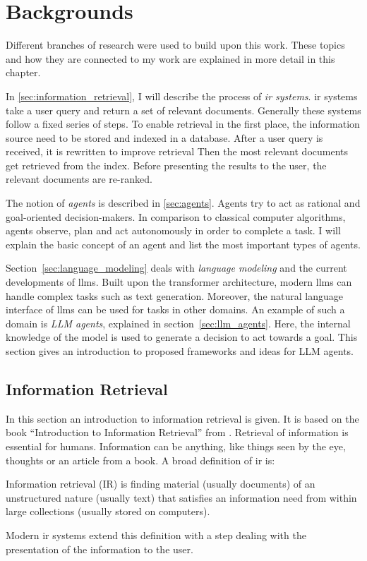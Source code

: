\documentclass[../main.tex]{subfiles}
\begin{document}
\chapter{Backgrounds}
\label{ch:backgrounds}

Different branches of research were used to build upon this work.
These topics and how they are connected to my work
are explained in more detail in this chapter.

In \autoref{sec:information_retrieval},
I will describe the process of \emph{\gls{ir} systems}.
\Gls{ir} systems take a user query and return a set of relevant documents.
Generally these systems follow a fixed series of steps.
To enable retrieval in the first place, the information source need to be stored and
indexed in a database.
After a user query is received, it is rewritten to improve retrieval
Then the most relevant documents get retrieved from the index.
Before presenting the results to the user, the relevant documents are re-ranked.

The notion of \emph{agents} is described in \autoref{sec:agents}.
Agents try to act as rational and goal-oriented decision-makers.
In comparison to classical computer algorithms,
agents observe, plan and act autonomously in order to complete a task.
I will explain the basic concept of an agent and list the most important types of agents.

Section~\ref{sec:language_modeling} deals with \emph{language modeling}
and the current developments of \glspl{llm}.
Built upon the transformer architecture,
modern \glspl{llm} can handle complex tasks such as text generation.
Moreover, the natural language interface of \glspl{llm} can be used for tasks in other domains.
An example of such a domain is \emph{LLM agents}, explained in section~\ref{sec:llm_agents}.
Here,
the internal knowledge of the model is used to generate a decision to act towards a goal.
This section gives an introduction to proposed frameworks and ideas for LLM agents.

\section{Information Retrieval}
\label{sec:information_retrieval}
In this section an introduction to information retrieval is given.
It is based on the book ``Introduction to Information Retrieval''
from \citeauthor{Manning2009} \cite{Manning2009}.
Retrieval of information is essential for humans.
Information can be anything, like things seen by the eye,
thoughts or an article from a book.
A broad definition of \gls{ir} is:
\begin{displayquote}
    Information retrieval (IR) is finding material (usually documents)
    of an unstructured nature (usually text)
    that satisfies an information need
    from within large collections (usually stored on computers).
\end{displayquote}
Modern \gls{ir} systems extend this definition with a step
dealing with the presentation of the information to the user.
\end{document}

